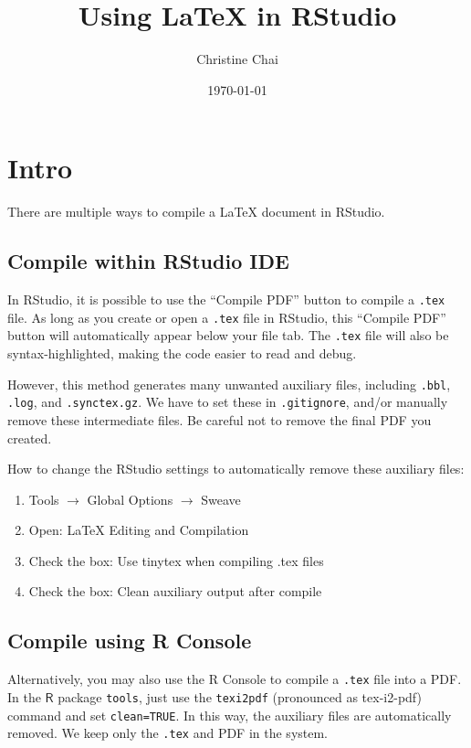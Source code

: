 \documentclass{article}
\title{Using LaTeX in RStudio}
\author{Christine Chai}
\date{\today}
\begin{document}
\maketitle

\section{Intro}

There are multiple ways to compile a LaTeX document in RStudio.

\subsection{Compile within RStudio IDE}

In RStudio, it is possible to use the ``Compile PDF'' button to compile a \texttt{.tex} file. As long as you create or open a \texttt{.tex} file in RStudio, this ``Compile PDF'' button will automatically appear below your file tab. The \texttt{.tex} file will also be syntax-highlighted, making the code easier to read and debug.

However, this method generates many unwanted auxiliary files, including \texttt{.bbl}, \texttt{.log}, and \texttt{.synctex.gz}. We have to set these in \texttt{.gitignore}, and/or manually remove these intermediate files. Be careful not to remove the final PDF you created.

How to change the RStudio settings to automatically remove these auxiliary files:

\begin{enumerate}
\item Tools $\rightarrow$ Global Options $\rightarrow$ Sweave
\item Open: LaTeX Editing and Compilation
\item Check the box: Use tinytex when compiling .tex files
\item Check the box: Clean auxiliary output after compile
\end{enumerate}


\subsection{Compile using R Console}

Alternatively, you may also use the R Console to compile a \texttt{.tex} file into a PDF. In the $\mathsf{R}$ package \texttt{tools}, just use the \texttt{texi2pdf} (pronounced as tex-i2-pdf) command and set \texttt{clean=TRUE}. In this way, the auxiliary files are automatically removed. We keep only the \texttt{.tex} and PDF in the system.
\end{document}
